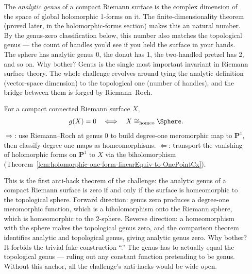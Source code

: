\begin{layman}
The \emph{analytic genus} of a compact Riemann surface is the complex
dimension of the space of global holomorphic 1-forms on it. The
finite-dimensionality theorem (proved later, in the holomorphic-forms
section) makes this an natural number. By the genus-zero classification below, this number also matches
the topological genus --- the count of handles you'd see if you held the
surface in your hands. The sphere has analytic genus 0, the donut has 1,
the two-handled pretzel has 2, and so on. Why bother? Genus is the
single most important invariant in Riemann surface theory. The whole
challenge revolves around tying the analytic definition (vector-space
dimension) to the topological one (number of handles), and the bridge
between them is forged by Riemann--Roch.
\end{layman}
\begin{theorem}
\label{thm:genus-zero-classification}
For a compact connected Riemann surface \(X\),
\[
  g(X)=0 \quad\Longleftrightarrow\quad X \cong_{\mathrm{homeo}} \Sphere .
\]
\leanok
\proofplan
\(\Rightarrow\): use Riemann--Roch at genus \(0\) to build degree-one meromorphic map
to \(\mathbf{P}^1\), then classify degree-one maps as homeomorphisms.
\(\Leftarrow\): transport the vanishing of holomorphic forms on \(\mathbf{P}^1\)
to \(X\) via the biholomorphism (Theorem~\ref{lem:holomorphic-one-form-linearEquiv-to-OnePointCx}).
\end{theorem}

\begin{layman}
This is the first anti-hack theorem of the challenge: the analytic
genus of a compact Riemann surface is zero if and only if the surface
is homeomorphic to the topological sphere. Forward direction: genus
zero produces a degree-one meromorphic function, which is a
biholomorphism onto the Riemann sphere, which is homeomorphic to the
2-sphere. Reverse direction: a homeomorphism with the sphere makes
the topological genus zero, and the comparison theorem identifies
analytic and topological genus, giving analytic genus zero. Why
bother? It forbids the trivial fake construction
``.'' The genus has to actually equal the
topological genus --- ruling out any constant function pretending to be
genus. Without this anchor, all the challenge's anti-hacks would be
wide open.
\end{layman}

